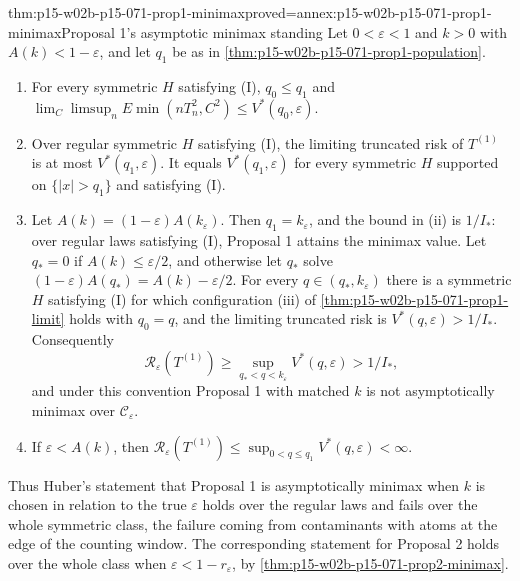 \begin{hbtheorem}{thm:p15-w02b-p15-071-prop1-minimax}{proved=annex:p15-w02b-p15-071-prop1-minimax}{Proposal 1's asymptotic minimax standing}
Let \(0<\varepsilon<1\) and \(k>0\) with \(A(k)<1-\varepsilon\), and let
\(q_1\) be as in \cref{thm:p15-w02b-p15-071-prop1-population}.
\begin{enumerate}
\item For every symmetric \(H\) satisfying (I), \(q_0\leq q_1\) and
 \(\lim_{C}\limsup_nE\min(nT_n^2,C^2)\leq V^*(q_0,\varepsilon)\).
\item Over regular symmetric \(H\) satisfying (I), the limiting
 truncated risk of \(T^{(1)}\) is at most \(V^*(q_1,\varepsilon)\). It
 equals \(V^*(q_1,\varepsilon)\) for every symmetric \(H\) supported on
 \(\{|x|>q_1\}\) and satisfying (I).
\item Let \(A(k)=(1-\varepsilon)A(k_\varepsilon)\). Then
 \(q_1=k_\varepsilon\), and the bound in (ii) is \(1/I_*\): over regular
 laws satisfying (I), Proposal 1 attains the minimax value. Let
 \(q_*=0\) if \(A(k)\leq\varepsilon/2\), and otherwise let \(q_*\) solve
 \((1-\varepsilon)A(q_*)=A(k)-\varepsilon/2\). For every
 \(q\in(q_*,k_\varepsilon)\) there is a symmetric \(H\) satisfying (I)
 for which configuration (iii) of
 \cref{thm:p15-w02b-p15-071-prop1-limit} holds with \(q_0=q\), and the
 limiting truncated risk is \(V^*(q,\varepsilon)>1/I_*\). Consequently
 \[
  \mathcal R_\varepsilon(T^{(1)})\geq
  \sup_{q_*<q<k_\varepsilon}V^*(q,\varepsilon)>1/I_*,
 \]
 and under this convention Proposal 1 with matched \(k\) is not
 asymptotically minimax over \(\mathcal C_\varepsilon\).
\item If \(\varepsilon<A(k)\), then
 \(\mathcal R_\varepsilon(T^{(1)})\leq\sup_{0<q\leq q_1}V^*(q,\varepsilon)<\infty\).
\end{enumerate}
\end{hbtheorem}

Thus Huber's statement that Proposal 1 is asymptotically minimax when
\(k\) is chosen in relation to the true \(\varepsilon\)
\cite[p.~96]{Huber1964RobustLocation} holds over the regular laws and
fails over the whole symmetric class, the failure coming from
contaminants with atoms at the edge of the counting window. The
corresponding statement for Proposal 2 holds over the whole class when
\(\varepsilon<1-r_\varepsilon\), by
\cref{thm:p15-w02b-p15-071-prop2-minimax}.


